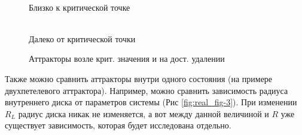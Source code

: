 \documentclass[12pt]{article}
\begin{document}
\begin{figure}[H]
	\centering
	\begin{minipage}[h]{0.47\linewidth}
		  \\ Близко к критической точке
	\end{minipage}
		\hfill
	\begin{minipage}[h]{0.47\linewidth}
		 \\ Далеко от критической точки
	\end{minipage}
	\label{fig:real_fig-2}
	\caption{Аттракторы возле крит. значения и на дост. удалении}
\end{figure}

Также можно сравнить аттракторы внутри одного состояния (на примере двухпетелевого аттрактора). Например, можно сравнить зависимость радиуса внутреннего диска от параметров системы (Рис \ref{fig:real_fig-3}).
При изменении $R_L$ радиус диска никак не изменяется, а вот между данной величиной и $R$ уже существует зависимость, которая будет исследована отдельно. 
\end{document}
